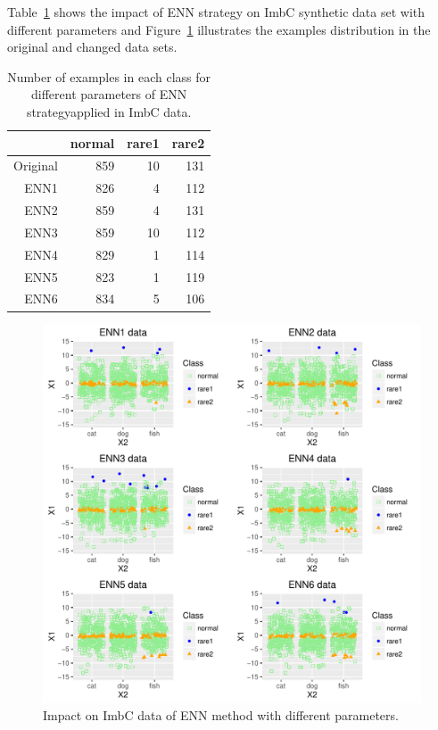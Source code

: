 \documentclass[10pt,a4paper]{article}\usepackage[]{graphicx}\usepackage[]{color}
\makeatletter
\def\maxwidth{ %
  \ifdim\Gin@nat@width>\linewidth
    \linewidth
  \else
    \Gin@nat@width
  \fi
}
\newenvironment{knitrout}{}{} %
\makeatother
\begin{document}
Table~\ref{tab:ImbC_ENN_table} shows the impact of ENN strategy on ImbC synthetic data set with different parameters and Figure~\ref{fig:ImbC_ENN_plot} illustrates the examples distribution in the original and changed data sets.

\begin{table}[ht]
\centering
\begin{tabular}{rrrr}
  \hline
 & normal & rare1 & rare2 \\ 
  \hline
Original & 859 &  10 & 131 \\ 
  ENN1 & 826 &   4 & 112 \\ 
  ENN2 & 859 &   4 & 131 \\ 
  ENN3 & 859 &  10 & 112 \\ 
  ENN4 & 829 &   1 & 114 \\ 
  ENN5 & 823 &   1 & 119 \\ 
  ENN6 & 834 &   5 & 106 \\ 
   \hline
\end{tabular}
\caption{Number of examples in each class for different parameters of ENN strategyapplied in ImbC data.} 
\label{tab:ImbC_ENN_table}
\end{table}


\begin{knitrout}\footnotesize
{}\color{fgcolor}\begin{figure}

{\centering \includegraphics[width=\maxwidth]{figures/UBL-ImbC_ENN_plot-1} 

}

\caption[Impact on ImbC data of ENN method with different parameters]{Impact on ImbC data of ENN method with different parameters.}\label{fig:ImbC_ENN_plot}
\end{figure}


\end{knitrout}
\end{document}
